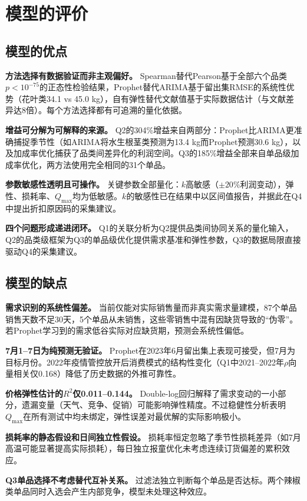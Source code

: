 
\section{模型的评价}

\subsection{模型的优点}

\textbf{方法选择有数据验证而非主观偏好。} Spearman替代Pearson基于全部六个品类$p<10^{-75}$的正态性检验结果，Prophet替代ARIMA基于留出集RMSE的系统性优势（花叶类34.1 vs 45.0 kg），自有弹性替代文献值基于实际数据估计（与文献\cite{Nie2024}差异达8倍）。每个方法选择都有可追溯的量化依据。

\textbf{增益可分解为可解释的来源。} Q2的304\%增益来自两部分：Prophet比ARIMA更准确捕捉季节性（如ARIMA将水生根茎类预测为13.4 kg而Prophet预测30.6 kg），以及加成率优化捕获了品类间差异化的利润空间。Q3的185\%增益全部来自单品级加成率优化，两方法使用完全相同的31个单品。

\textbf{参数敏感性透明且可操作。} 关键参数全部量化：$k$高敏感（$\pm 20\%$利润变动），弹性、损耗率、$Q_{\max}$均为低敏感。$k$的敏感性已在结果中以区间值报告，并据此在Q4中提出折扣原因码的采集建议。

\textbf{四个问题形成递进闭环。} Q1的关联分析为Q2提供品类间协同关系的量化输入，Q2的品类级框架为Q3的单品级优化提供需求基准和弹性参数，Q3的数据局限直接驱动Q4的采集建议。

\subsection{模型的缺点}

\textbf{需求识别的系统性偏差。} 当前仅能对实际销售量而非真实需求量建模，87个单品销售天数不足30天，5个单品从未销售，这些零销售中混有因缺货导致的“伪零”。若Prophet学习到的需求低谷实际对应缺货期，预测会系统性偏低。

\textbf{7月1--7日为纯预测无验证。} Prophet在2023年6月留出集上表现可接受，但7月为目标月份。2022年疫情管控放开后消费模式的结构性变化（Q1中2021--2022年$\rho$向量相关仅0.168）降低了历史数据的外推可靠性。

\textbf{价格弹性估计的$R^2$仅0.011--0.144。} Double-log回归解释了需求变动的一小部分，遗漏变量（天气、竞争、促销）可能影响弹性精度。不过稳健性分析表明$Q_{\max}$在所有测试中均未绑定，弹性误差对最优解的实际影响极小。

\textbf{损耗率的静态假设和日间独立性假设。} 损耗率恒定忽略了季节性损耗差异（如7月高温可能显著提高实际损耗），每日独立报童优化未考虑连续订货偏差的累积效应。

\textbf{Q3单品选择不考虑替代互补关系。} 过滤法独立判断每个单品是否达标。两个辣椒类单品同时入选会产生内部竞争，模型未处理这种效应。
